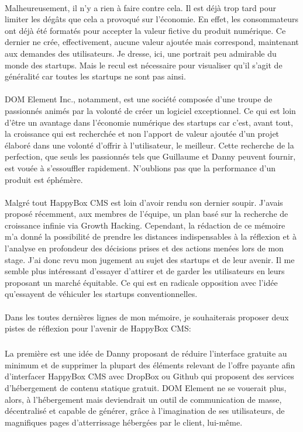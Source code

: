 \documentclass[11pt, a4paper ]{article}
\begin{document}
\begin{spacing}{1.5}
\paragraph{}
Malheureusement, il n'y a rien à faire contre cela. Il est déjà trop tard pour limiter les dégâts que cela a provoqué sur l'économie. En effet, les consommateurs ont déjà été formatés pour accepter la valeur fictive du produit numérique. Ce dernier ne crée, effectivement, aucune valeur ajoutée mais correspond, maintenant aux demandes des utilisateurs. Je dresse, ici, une portrait peu admirable du monde des  startups. Mais le recul est nécessaire pour visualiser qu'il s'agit de généralité car toutes les startups ne sont pas ainsi. 

\paragraph{}
DOM Element Inc., notamment, est une société composée d'une troupe de passionnés animés par la volonté de créer un logiciel exceptionnel. Ce qui est loin d'être un avantage dans l’économie numérique des startups car c'est, avant tout, la croissance qui est recherchée et non l'apport de valeur ajoutée d'un projet élaboré dans une volonté d'offrir à l'utilisateur, le meilleur.
 Cette recherche de la perfection, que seuls les passionnés tels que Guillaume et Danny peuvent fournir, est vouée à s’essouffler rapidement. N'oublions pas que la performance d'un produit est éphémère.

\paragraph{}
Malgré tout HappyBox CMS est loin d'avoir rendu son dernier soupir. J'avais proposé récemment, aux membres de l'équipe, un plan basé sur la recherche de croissance infinie via Growth Hacking. Cependant, la rédaction de ce mémoire m'a donné la possibilité de prendre les distances indispensables à la réflexion et à l'analyse en profondeur des décisions prises et des actions menées lors de mon stage. J'ai donc revu mon jugement au sujet des startups et de leur avenir.
Il me semble plus intéressant d'essayer d'attirer et de garder les utilisateurs en leurs proposant un marché équitable. Ce qui est en radicale opposition avec l'idée qu'essayent de véhiculer les startups conventionnelles.
\paragraph{}
Dans les toutes dernières lignes de mon mémoire, je souhaiterais proposer deux pistes de réflexion pour l'avenir de HappyBox CMS:
\subparagraph{}
La première est une idée de Danny proposant de réduire l'interface gratuite au minimum et de supprimer la plupart des éléments relevant de l'offre payante afin d'interfacer HappyBox CMS avec DropBox ou Github qui proposent des services d'hébergement de contenu statique gratuit. DOM Element ne se vouerait plus, alors, à l'hébergement mais deviendrait un outil de communication de masse, décentralisé et capable de générer, grâce à l'imagination de ses utilisateurs, de magnifiques pages d'atterrissage hébergées par le client, lui-même. 


\end{spacing}
\end{document}
